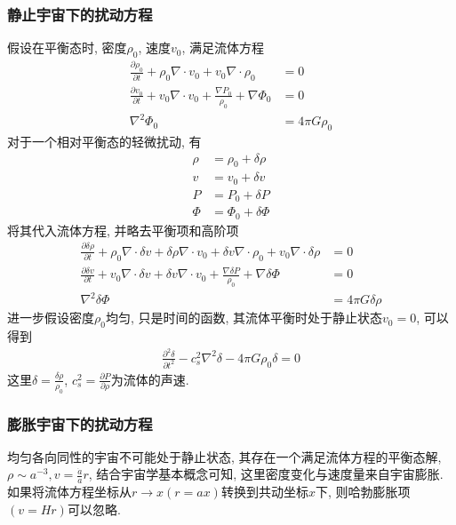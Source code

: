 \subsubsection{静止宇宙下的扰动方程}
假设在平衡态时, 密度$\rho_0$, 速度$v_0$, 满足流体方程
\begin{align*}
    \frac{\partial \rho_0}{\partial t}+\rho_0 \nabla\cdot v_0+v_0 \nabla \cdot \rho_0&=0\\
    \frac{\partial v_0}{\partial t}+v_0 \nabla \cdot v_0+\frac{\nabla P_0}{\rho_0}+\nabla \Phi_0&=0\\
    \nabla^2 \Phi_0&=4\pi G\rho_0
\end{align*}
对于一个相对平衡态的轻微扰动, 有
\begin{align*}
    \rho&=\rho_0+\delta \rho\\
    v&=v_0+\delta v\\
    P&=P_0+\delta P\\
    \Phi&=\Phi_0+\delta \Phi
\end{align*}
将其代入流体方程, 并略去平衡项和高阶项
\begin{align*}
    \frac{\partial \delta\rho}{\partial t}+\rho_0 \nabla\cdot \delta v+\delta \rho \nabla\cdot v_0+\delta v \nabla \cdot \rho_0+v_0 \nabla \cdot \delta \rho&=0\\
    \frac{\partial \delta v}{\partial t}+v_0 \nabla \cdot \delta v+ \delta v \nabla \cdot v_0+\frac{\nabla  \delta P}{\rho_0}+\nabla  \delta \Phi&=0\\
    \nabla^2  \delta \Phi&=4\pi G \delta\rho
\end{align*}
进一步假设密度$\rho_0$均匀, 只是时间的函数, 其流体平衡时处于静止状态$v_0=0$, 可以得到
\begin{align}
    \frac{\partial^2 \delta}{\partial t^2}-c_s^2 \nabla^2\delta-4\pi G \rho_0 \delta=0 \label{EE4}
\end{align}
这里$\delta=\frac{\delta \rho}{\rho_0}$, $c_s^2=\frac{\partial P}{\partial \rho}$为流体的声速. 

\subsubsection{膨胀宇宙下的扰动方程}
均匀各向同性的宇宙不可能处于静止状态, 其存在一个满足流体方程的平衡态解, $\rho\sim a^{-3}, v=\frac{\dot{a}}{a}r$, 结合宇宙学基本概念可知, 这里密度变化与速度量来自宇宙膨胀. 如果将流体方程坐标从$r\rightarrow x (r=ax)$转换到共动坐标$x$下, 则哈勃膨胀项$(v=Hr)$可以忽略. 

